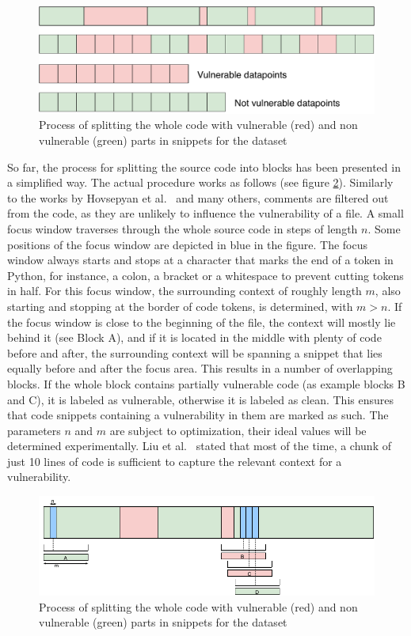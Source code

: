 \documentclass[
a4paper,
pagesize,
pdftex,
12pt,
twoside, %
BCOR=5mm, %
ngerman,
fleqn,
final,
]{scrartcl}
\begin{document}
	\begin{figure}[ht]
		\centering
		\includegraphics[width=0.8\linewidth]{img/collectData2}
		\caption{Process of splitting the whole code with vulnerable (red) and non vulnerable (green) parts in snippets for the dataset}
		\label{fig:collectData2}
	\end{figure}
	
	So far, the process for splitting the source code into blocks has been presented in a simplified way. The actual procedure works as follows (see figure \ref{fig:FocusBlocks}).%
	Similarly to the works by Hovsepyan et al.~\cite{Hovsepyan.2012} and many others, comments are filtered out from the code, as they are unlikely to influence the vulnerability of a file. A small focus window traverses through the whole source code in steps of length $n$. Some positions of the focus window are depicted in blue in the figure. The focus window always starts and stops at a character that marks the end of a token in Python, for instance, a colon, a bracket or a whitespace to prevent cutting tokens in half. For this focus window, the surrounding context of roughly length $m$, also starting and stopping at the border of code tokens, is determined, with $m > n$. If the focus window is close to the beginning of the file, the context will mostly lie behind it (see Block A), and if it is located in the middle with plenty of code before and after, the surrounding context will be spanning a snippet that lies equally before and after the focus area. This results in a number of overlapping blocks. If the whole block contains partially vulnerable code (as example blocks B and C), it is labeled as vulnerable, otherwise it is labeled as clean. This ensures that code snippets containing a vulnerability in them are marked as such. The parameters $n$ and $m$ are subject to optimization, their ideal values will be determined experimentally. Liu et al.~\cite{Liu.2018} stated that most of the time, a chunk of just 10 lines of code is sufficient to capture the relevant context for a vulnerability.
	
	\begin{figure}[ht]
		\centering
		\includegraphics[width=0.9\linewidth]{img/FocusBlocks}
		\caption{Process of splitting the whole code with vulnerable (red) and non vulnerable (green) parts in snippets for the dataset}
		\label{fig:FocusBlocks}
	\end{figure}
	
\end{document}
